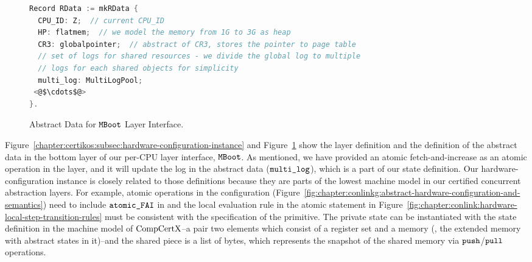 \begin{figure}
\begin{lstlisting}[language=C]
Record RData := mkRData {
  CPU_ID: Z;  // current CPU_ID
  HP: flatmem;  // we model the memory from 1G to 3G as heap            
  CR3: globalpointer;  // abstract of CR3, stores the pointer to page table
  // set of logs for shared resources - we divide the global log to multiple
  // logs for each shared objects for simplicity   
  multi_log: MultiLogPool;     
 <@$\cdots$@>
}.
\end{lstlisting}
\caption{Abstract Data for  ${\mathrm{\texttt{MBoot}}}$ Layer Interface.}
\label{fig:chapter:certikos:abstract-data-for-bottom-layer}
\end{figure}

Figure~\ref{chapter:certikos:subsec:hardware-configuration-instance}
 and 
  Figure~\ref{fig:chapter:certikos:abstract-data-for-bottom-layer}
  show the layer definition 
  and the definition of the abstract data 
  in the bottom layer of our per-CPU layer interface, ${\mathrm{\texttt{MBoot}}}$.
%
As mentioned, 
we have provided an atomic fetch-and-increase as an atomic operation in the layer,
and it will update the log in the abstract data (${\mathrm{\texttt{multi\_log}}}$), which is 
a part of our state definition. 
Our hardware-configuration instance is closely related to those definitions
because they are parts of the lowest machine model 
in our certified concurrent abstraction layers.
For example, atomic operations in the configuration (Figure~\ref{fig:chapter:conlinkg:abstract-hardware-configuration-and-semantics})
need to include ${\mathrm{\texttt{atomic\_FAI}}}$  
in and the local evaluation rule in the atomic statement in Figure~\ref{fig:chapter:conlink:hardware-local-step-transition-rules}  must be
consistent with the specification of the primitive.
The private state can be instantiated with 
the state definition in the machine model of $\mathrm{CompCertX}$--a pair two elements which consist of a register set 
and a memory (\ie, the extended memory with  abstract states in it)--and the shared piece is a list of bytes, which represents 
the snapshot of the shared memory via ${\mathrm{\texttt{push}}}$/${\mathrm{\texttt{pull}}}$ operations. 

